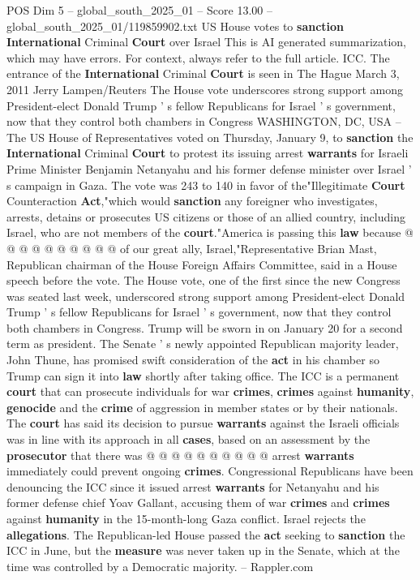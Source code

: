 \begin{textsample}{POS Dim 5 – global\_south\_2025\_01 – Score 13.00 – global\_south\_2025\_01/119859902.txt}  \label{ex:f5_pos_359}
US House votes to \textbf{sanction} \textbf{International} Criminal \textbf{Court} over Israel This is AI generated summarization, which may have errors.
For context, always refer to the full article.
ICC.
The entrance of the \textbf{International} Criminal \textbf{Court} is seen in The Hague March 3, 2011 Jerry Lampen/Reuters The House vote underscores strong support among President-elect Donald Trump ' s fellow Republicans for Israel ' s government, now that they control both chambers in Congress WASHINGTON, DC, USA -- The US House of Representatives voted on Thursday, January 9, to \textbf{sanction} the \textbf{International} Criminal \textbf{Court} to protest its issuing arrest \textbf{warrants} for Israeli Prime Minister Benjamin Netanyahu and his former defense minister over Israel ' s campaign in Gaza.
The vote was 243 to 140 in favor of the"Illegitimate \textbf{Court} Counteraction \textbf{Act},"which would \textbf{sanction} any foreigner who investigates, arrests, detains or prosecutes US citizens or those of an allied country, including Israel, who are not members of the \textbf{court}."America is passing this \textbf{law} because @ @ @ @ @ @ @ @ @ @ of our great ally, Israel,"Representative Brian Mast, Republican chairman of the House Foreign Affairs Committee, said in a House speech before the vote.
The House vote, one of the first since the new Congress was seated last week, underscored strong support among President-elect Donald Trump ' s fellow Republicans for Israel ' s government, now that they control both chambers in Congress.
Trump will be sworn in on January 20 for a second term as president.
The Senate ' s newly appointed Republican majority leader, John Thune, has promised swift consideration of the \textbf{act} in his chamber so Trump can sign it into \textbf{law} shortly after taking office.
The ICC is a permanent \textbf{court} that can prosecute individuals for war \textbf{crimes}, \textbf{crimes} against \textbf{humanity}, \textbf{genocide} and the \textbf{crime} of aggression in member states or by their nationals.
The \textbf{court} has said its decision to pursue \textbf{warrants} against the Israeli officials was in line with its approach in all \textbf{cases}, based on an assessment by the \textbf{prosecutor} that there was @ @ @ @ @ @ @ @ @ @ arrest \textbf{warrants} immediately could prevent ongoing \textbf{crimes}.
Congressional Republicans have been denouncing the ICC since it issued arrest \textbf{warrants} for Netanyahu and his former defense chief Yoav Gallant, accusing them of war \textbf{crimes} and \textbf{crimes} against \textbf{humanity} in the 15-month-long Gaza conflict.
Israel rejects the \textbf{allegations}.
The Republican-led House passed the \textbf{act} seeking to \textbf{sanction} the ICC in June, but the \textbf{measure} was never taken up in the Senate, which at the time was controlled by a Democratic majority. -- Rappler.com

\end{textsample}
